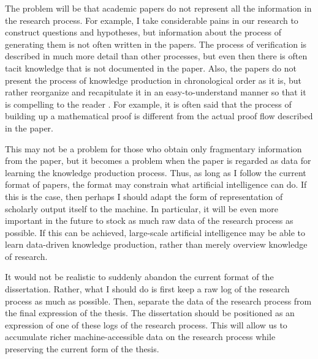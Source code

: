 \documentclass{book}
\begin{document}
The problem will be that academic papers do not represent all the information in the research process. For example, I take considerable pains in our research to construct questions and hypotheses, but information about the process of generating them is not often written in the papers. The process of verification is described in much more detail than other processes, but even then there is often tacit knowledge that is not documented in the paper. Also, the papers do not present the process of knowledge production in chronological order as it is, but rather reorganize and recapitulate it in an easy-to-understand manner so that it is compelling to the reader \cite{schickore2008doing}. For example, it is often said that the process of building up a mathematical proof is different from the actual proof flow described in the paper. 

This may not be a problem for those who obtain only fragmentary information from the paper, but it becomes a problem when the paper is regarded as data for learning the knowledge production process. Thus, as long as I follow the current format of papers, the format may constrain what artificial intelligence can do. If this is the case, then perhaps I should adapt the form of representation of scholarly output itself to the machine. In particular, it will be even more important in the future to stock as much raw data of the research process as possible. If this can be achieved, large-scale artificial intelligence may be able to learn data-driven knowledge production, rather than merely overview knowledge of research.

It would not be realistic to suddenly abandon the current format of the dissertation. Rather, what I should do is first keep a raw log of the research process as much as possible. Then, separate the data of the research process from the final expression of the thesis. The dissertation should be positioned as an expression of one of these logs of the research process. This will allow us to accumulate richer machine-accessible data on the research process while preserving the current form of the thesis.

\end{document}
